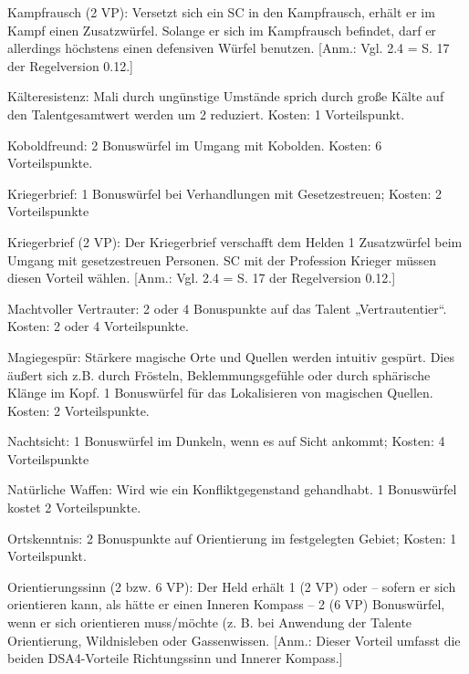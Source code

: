 \begin{description}
\item{Kampfrausch (2 VP):}
Versetzt sich ein SC in den Kampfrausch, erhält er im Kampf einen Zusatzwürfel. Solange er sich im Kampfrausch befindet, darf er allerdings höchstens einen defensiven Würfel benutzen. [Anm.: Vgl. 2.4 = S. 17 der Regelversion 0.12.]

\item{Kälteresistenz:} Mali durch ungünstige Umstände sprich durch große Kälte auf den Talentgesamtwert werden um 2 reduziert. Kosten: 1 Vorteilspunkt.

\item{Koboldfreund:} 2 Bonuswürfel im Umgang mit Kobolden. Kosten: 6 Vorteilspunkte.

\item{Kriegerbrief:} 1 Bonuswürfel bei Verhandlungen mit Gesetzestreuen; Kosten: 2 Vorteilspunkte

\item{Kriegerbrief (2 VP):}
Der Kriegerbrief verschafft dem Helden 1 Zusatzwürfel beim Umgang mit gesetzestreuen Personen. SC mit der Profession Krieger müssen diesen Vorteil wählen. [Anm.: Vgl. 2.4 = S. 17 der Regelversion 0.12.]

\item{Machtvoller Vertrauter:} 2 oder 4 Bonuspunkte auf das Talent „Vertrautentier“. Kosten: 2 oder 4 Vorteilspunkte.

\item{Magiegespür:} Stärkere magische Orte und Quellen werden intuitiv gespürt. Dies äußert sich z.B. durch Frösteln, Beklemmungsgefühle oder durch sphärische Klänge im Kopf. 1 Bonuswürfel für das Lokalisieren von magischen Quellen. Kosten: 2 Vorteilspunkte.

\item{Nachtsicht:} 1 Bonuswürfel im Dunkeln, wenn es auf Sicht ankommt; Kosten: 4 Vorteilspunkte

\item{Natürliche Waffen:} Wird wie ein Konfliktgegenstand gehandhabt. 1 Bonuswürfel kostet 2 Vorteilspunkte.

\item{Ortskenntnis:} 2 Bonuspunkte auf Orientierung im festgelegten Gebiet; Kosten: 1 Vorteilspunkt.

\item{Orientierungssinn (2 bzw. 6 VP):}
Der Held erhält 1 (2 VP) oder – sofern er sich orientieren kann, als hätte er einen Inneren Kompass – 2 (6 VP) Bonuswürfel, wenn er sich orientieren muss/möchte (z. B. bei Anwendung der Talente Orientierung, Wildnisleben oder Gassenwissen. [Anm.: Dieser Vorteil umfasst die beiden DSA4-Vorteile Richtungssinn und Innerer Kompass.]


\end{description}
